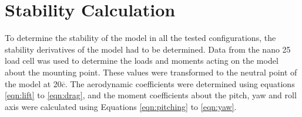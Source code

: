 \section{Stability Calculation}
To determine the stability of the model in all the tested configurations, the stability derivatives of the model had to be determined. Data from the nano 25 load cell was used to determine the loads and moments acting on the model about the mounting point. These values were transformed  to the neutral point of the model at 20$\overline{c}$. The aerodynamic coefficients were determined using equations \ref{eqn:lift} to \ref{eqn:drag}, and the moment coefficients about the pitch, yaw and roll axis were calculated using Equations \ref{eqn:pitching} to \ref{eqn:yaw}. 




